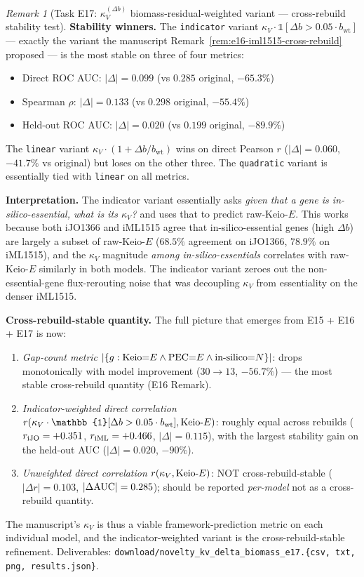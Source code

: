 \documentclass[11pt,a4paper]{article}
\theoremstyle{plain}
\theoremstyle{definition}
\theoremstyle{remark}
\newtheorem{remark}[theorem]{Remark}
\begin{document}
\begin{remark}[Task E17: $\kappa_V^{(\Delta b)}$ biomass-residual-weighted
variant --- cross-rebuild stability test]
\textbf{Stability winners.} The \texttt{indicator} variant
$\kappa_V \cdot \mathbb{1}[\Delta b > 0.05 \cdot b_{\mathrm{wt}}]$
--- exactly the variant the manuscript Remark~\ref{rem:e16-iml1515-cross-rebuild}
proposed --- is the most stable on three of four metrics:
\begin{itemize}
\item Direct ROC AUC: $|\Delta| = 0.099$ (vs $0.285$ original, $-65.3\%$)
\item Spearman $\rho$: $|\Delta| = 0.133$ (vs $0.298$ original, $-55.4\%$)
\item Held-out ROC AUC: $|\Delta| = 0.020$ (vs $0.199$ original, $\mathbf{-89.9\%}$)
\end{itemize}
The \texttt{linear} variant $\kappa_V \cdot (1 + \Delta b/b_{\mathrm{wt}})$
wins on direct Pearson $r$ ($|\Delta| = 0.060$, $-41.7\%$ vs original)
but loses on the other three. The \texttt{quadratic} variant is essentially
tied with \texttt{linear} on all metrics.

\textbf{Interpretation.} The indicator variant essentially asks
\emph{given that a gene is in-silico-essential, what is its $\kappa_V$?}
and uses that to predict raw-Keio-$E$. This works because both iJO1366
and iML1515 agree that in-silico-essential genes (high $\Delta b$) are
largely a subset of raw-Keio-$E$ ($68.5\%$ agreement on iJO1366, $78.9\%$
on iML1515), and the $\kappa_V$ magnitude \emph{among in-silico-essentials}
correlates with raw-Keio-$E$ similarly in both models. The indicator
variant zeroes out the non-essential-gene flux-rerouting noise that
was decoupling $\kappa_V$ from essentiality on the denser iML1515.

\textbf{Cross-rebuild-stable quantity.} The full picture that emerges
from E15 + E16 + E17 is now:
\begin{enumerate}
\item \emph{Gap-count metric} $|\{g : \textnormal{Keio}{=}E \land
\textnormal{PEC}{=}E \land \textnormal{in-silico}{=}N\}|$: drops
monotonically with model improvement ($30 \to 13$, $-56.7\%$) ---
the most stable cross-rebuild quantity (E16 Remark).
\item \emph{Indicator-weighted direct correlation}
$r(\kappa_V \cdot \mathbb{1}[\Delta b > 0.05 \cdot b_{\mathrm{wt}}],
\textnormal{Keio-}E)$: roughly equal across rebuilds
($r_{\textnormal{iJO}} = +0.351$, $r_{\textnormal{iML}} = +0.466$,
$|\Delta| = 0.115$), with the largest stability gain on the
held-out AUC ($|\Delta| = 0.020$, $-90\%$).
\item \emph{Unweighted direct correlation} $r(\kappa_V, \textnormal{Keio-}E)$:
NOT cross-rebuild-stable ($|\Delta r| = 0.103$,
$|\Delta \textnormal{AUC}| = 0.285$); should be reported
\emph{per-model} not as a cross-rebuild quantity.
\end{enumerate}
The manuscript's $\kappa_V$ is thus a viable framework-prediction
metric on each individual model, and the indicator-weighted variant
is the cross-rebuild-stable refinement. Deliverables:
\texttt{download/novelty\_kv\_delta\_biomass\_e17.\{csv, txt, png,
results.json\}}.
\end{remark}
\end{document}

